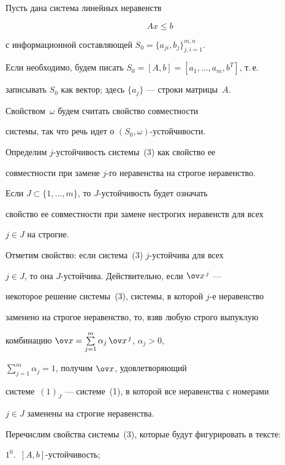 Пусть дана система линейных неравенств


\begin{equation}


Ax\leq b


\end{equation}


с информационной составляющей $S_0=\{a_{ji},b_j\}_{j,i=1}^{m,n}$.


Если необходимо, будем писать $S_0=[A,b]=[a_1,\dotsc,a_m,b^T]$, т.\,е.


записывать $S_0$ как вектор; здесь $\{a_j\}$ --- строки матрицы~$A$.


Свойством~$\omega$ будем считать свойство совместности


системы, так что речь идет о $(S_0,\omega)$-устойчивости.





Определим $j$-устойчивость системы~(3) как свойство ее


совместности при замене $j$-го неравенства на строгое неравенство.


Если $J\subset \{1,\dotsc,m\}$, то $J$-устойчивость будет означать


свойство ее совместности при замене нестрогих неравенств для всех


$j\in J$ на строгие.





Отметим свойство: если система~(3)\; $j$-устойчива для всех


$j\in J$, то она $J$-устойчива. Действительно, если $\ov x^{\,j}$ ---


некоторое решение системы~(3), системы, в которой $j$-е неравенство


заменено на строгое неравенство, то, взяв любую строго выпуклую


комбинацию $\ov x=\sum\limits_{j=1}^m\alpha_j\,\ov x^{\,j}$, $\alpha_j>0$,


$\sum\limits_{j=1}^m\alpha_j=1$, получим $\ov x$, удовлетворяющий


системе~$(1)_J$ --- системе~(1), в которой все неравенства с номерами


$j\in J$ заменены на строгие неравенства.





Перечислим свойства системы~(3), которые будут фигурировать в тексте:


$1^0.$~$[A,b]$-устойчи\-вость;


